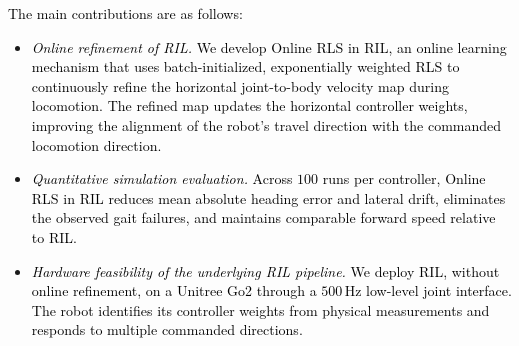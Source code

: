 \documentclass[a4paper, 10pt, conference]{ieeeconf}
\newcommand{\oldtext}[1]{\textcolor{red}{}}
\newcommand{\newtext}[1]{\textcolor{black}{#1}}
\begin{document}
\newtext{The main contributions are as follows:}
\begin{itemize}
  \item \newtext{\emph{Online refinement of RIL.} We develop Online RLS in RIL, an
        online learning mechanism that uses batch-initialized, exponentially
        weighted RLS to continuously refine the horizontal joint-to-body
        velocity map during locomotion. The refined map updates the horizontal
        controller weights, improving the alignment of the robot's travel
        direction with the commanded locomotion direction.}
  \item \newtext{\emph{Quantitative simulation evaluation.} Across $100$ runs
        per controller, Online RLS in RIL reduces mean absolute heading error and
        lateral drift, eliminates the observed gait failures, and maintains
        comparable forward speed relative to RIL.}
  \item \newtext{\emph{Hardware feasibility of the underlying RIL pipeline.}
        We deploy RIL, without online refinement, on a Unitree Go2 through a
        $500$\,Hz low-level joint interface. The robot identifies its controller
        weights from physical measurements and responds to multiple commanded
        directions.}
\end{itemize}

\end{document}
